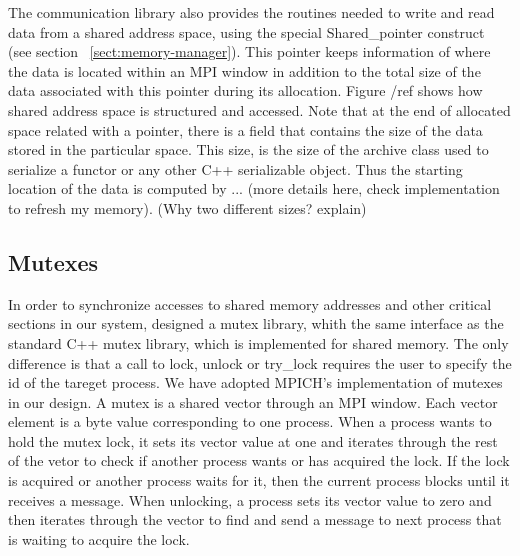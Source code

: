 The communication library also provides the routines needed to write and read data from a shared address space,
using the special Shared\_pointer construct (see section ~\ref{sect:memory-manager}).  
This pointer keeps information of where the data is
located within an MPI window in addition to the total size of the data associated with this pointer during its 
allocation. Figure /ref shows how shared address space is structured and accessed.  Note that at the end of 
allocated space related with a pointer, there is a field that contains the size of the data stored in the 
particular space.  This size, is the size of the archive class used to serialize a functor or any other C++
serializable object.  Thus the starting location of the data is computed by ... (more details here, check
implementation to refresh my memory). (Why two different sizes? explain)

\subsection{Mutexes}
In order to synchronize accesses to shared memory addresses and other critical sections in our system, designed
a mutex library, whith the same interface as the standard C++ mutex library, which is implemented
for shared memory.  The only difference is that a call to lock, unlock or try\_lock requires the user to specify
the id of the tareget process. We have adopted MPICH's implementation of mutexes in our design.  A mutex is a
shared vector through an MPI window.  Each vector element is a byte value corresponding to one process.  When
a process wants to hold the mutex lock, it sets its vector value at one and iterates through the rest of the 
vetor to check if another process wants or has acquired the lock.  If the lock is acquired or another process 
waits for it, then the current process blocks until it receives a message.  When unlocking, a process sets its 
vector value to zero and then iterates through the vector to find and send a message to next process that is 
waiting to acquire the lock.  

\label{sect:memory-manager}

